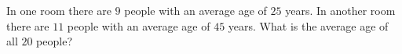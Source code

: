 In one room there are $9$ people with an average age of $25$ years. In another room there are $11$ people with an average age of $45$ years. What is the average age of all $20$ people?
